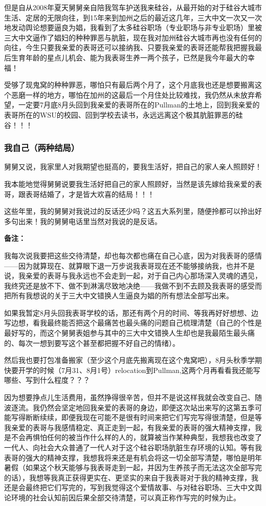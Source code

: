 \documentclass[9pt, b5paper]{article}
\begin{document}
但是自从2008年夏天舅舅亲自陪我驾车护送我来硅谷，从最开始的对于硅谷大城市生活、定居的无限向往，到15年来到加州之后的最近这几年，三大中文一次又一次地发动舆论想要逼良为娼，我看到了太多硅谷职场（专业职场与非专业职场）里被三大中文逼作了娼妇的种种罪恶与肮脏，现在我对加州硅谷大城市再也没有任何的向往，今生只要我亲爱的表哥还可以接纳我、只要我亲爱的表哥还能帮我把握我最后生育年龄的星点儿机会、能为我表哥生养一两个孩子，已然是我今年最大的幸福！

受够了现鬼窝的种种罪恶，哪怕只有最后两个月了，这个月底我也还是想要搬离这个恶磨一样的地方，哪怕在加州的这最后一个月住处比较难找，我仍然从未放弃希望，一定要7月底8月头回到我亲爱的表哥所在的Pullman的土地上，回到我亲爱的表哥所在的WSU的校园、回到学校去读书，永远远离这个极其肮脏罪恶的硅谷！！！

\subsubsection{我自己（两种结局）}
\label{sec:org28d3791}


舅舅又说，我家里人对我期望也挺高的，要我生活好，把自己的家人亲人照顾好！

我本能地觉得舅舅说要我生活好把自己的家人照顾好，当然是该先嫁给我亲爱的表哥，跟表哥结婚了，才是皆大欢喜的结局！！！

这些年里，我的舅舅对我说过的反话还少吗？这五大系列里，随便拎都可以拎出好多句出来！我的舅舅电话里当然对我说的是反话。 

\textbf{备注：}

我每次说我要把这些交待清楚，却也每次都也痛在自己心底，因为对我表哥的感情——因为就算现在、就算眼下退一万步说我表哥现在还不能够接纳我，也并不是说，我亲爱的表哥与我永远也不会走到一起，对于自己内心那场深入灵魂的遇见，我终究还是放不下、做不到淋漓尽致地决绝——我做不到不去顾及我表哥的感受而把所有我想说的关于三大中文错换人生逼良为娼的所有想法全部写出来。

如果我暂定8月头回我表哥学校的话，那还有两个月的时间、等我再好好想想、边写边想，看我最终能否把这个最痛苦也最头痛的问题自己梳理清楚（自己的个性是最好写的，而这个舅舅表姐参与其中的三大中文错换人生却也是我最陌生最头痛的、每次一想到要写这个甚至都把握不好自己的情绪）。

然后我也要打包准备搬家（至少这个月底先搬离现在这个鬼窝吧），8月头秋季学期快要开学的时候（7月31、8月1号）relocation到Pullman,这两个月再看看我还能写哪些、写到什么程度？？？

因为想要挣点儿生活费用，虽然挣得很辛苦，但并不是说这样我就会改变自己、随波逐流。我仍然会坚定地回我亲爱的表哥的身边，即便这次站出来写的这第五季可能写得断断续续，即便我现在可能不是很有时间来把它们写完写得很清楚，但是等我亲爱的表哥与我感情稳定、真正走到一起，有我亲爱的表哥的强大精神支撑，我是不会再惧怕任何的被当作什么样的人的，就算被当作某种典型，我想我也改变了一代人、向社会大众普通了一代人对于这个硅谷职场肮脏生存环境的认知。等有我表哥的强大的精神支撑，我想我将来还是有机会将这一切全部写清楚，哪怕是明年暑假（如果这个秋天能够与我表哥走到一起，并因为生养孩子而无法这次全部写完的话），我想等我真正获得更实在、更坚实的来自于我表哥对于我的精神支撑，我还是会最终把它们写完的，写到我觉得这个爱情故事、与对硅谷职场、三大中文舆论环境的社会认知前因后果全部交待清楚，可以真正称作写完的时候为止。 
\end{document}

